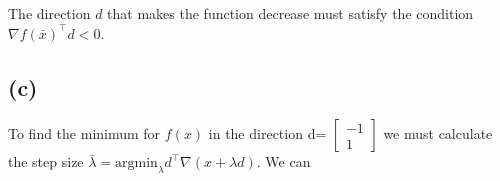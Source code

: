 \documentclass{article}
\begin{document}
	The direction $d$ that makes the function decrease must satisfy the condition $\nabla f(\bar{x})^\top d <0$.
\subsection*{(c)}
	To find the minimum for $f(x)$ in the direction d= $\begin{bmatrix}-1 \\ 1\end{bmatrix}$ we must calculate the step size $\bar{\lambda}=\text{argmin}_{\lambda} d^\top \nabla(x+ \lambda d)$. We can 
\end{document}
